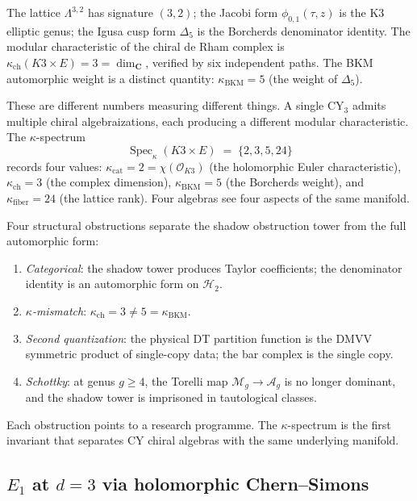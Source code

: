 \documentclass[11pt,reqno]{amsart}
\theoremstyle{definition}
\theoremstyle{remark}
\newcommand{\cM}{\mathcal{M}}
\renewcommand{\Bbbk}{\mathbf{C}}
\numberwithin{equation}{section}
\begin{document}
The lattice $\Lambda^{3,2}$ has signature $(3,2)$; the
Jacobi form $\phi_{0,1}(\tau, z)$ is the K3 elliptic genus;
the Igusa cusp form $\Delta_5$ is the Borcherds denominator
identity. The modular characteristic of the chiral de Rham
complex is $\kappa_{\mathrm{ch}}(K3 \times E) = 3
= \dim_\Bbbk$, verified by six independent paths. The BKM
automorphic weight is a distinct quantity:
$\kappa_{\mathrm{BKM}} = 5$ (the weight of $\Delta_5$).

These are different numbers measuring different things.
A single CY$_3$ admits multiple chiral algebraizations,
each producing a different modular characteristic. The
$\kappa$-spectrum
\begin{equation}\label{eq:kappa-spectrum}
\operatorname{Spec}_\kappa(K3 \times E)
\;=\; \{2, 3, 5, 24\}
\end{equation}
records four values: $\kappa_{\mathrm{cat}} = 2
= \chi(\mathcal{O}_{K3})$ (the holomorphic Euler
characteristic), $\kappa_{\mathrm{ch}} = 3$ (the complex
dimension), $\kappa_{\mathrm{BKM}} = 5$ (the Borcherds
weight), and $\kappa_{\mathrm{fiber}} = 24$ (the lattice
rank). Four algebras see four aspects of the same manifold.

Four structural obstructions separate the shadow obstruction
tower from the full automorphic form:
\begin{enumerate}[label=\textup{(O\arabic*)}]
\item \emph{Categorical}: the shadow tower produces Taylor
 coefficients; the denominator identity is an automorphic form
 on $\mathcal{H}_2$.
\item \emph{$\kappa$-mismatch}:
 $\kappa_{\mathrm{ch}} = 3 \ne 5 = \kappa_{\mathrm{BKM}}$.
\item \emph{Second quantization}: the physical DT partition
 function is the DMVV symmetric product of single-copy data;
 the bar complex is the single copy.
\item \emph{Schottky}: at genus $g \ge 4$, the Torelli map
 $\cM_g \to \mathcal{A}_g$ is no longer dominant, and the
 shadow tower is imprisoned in tautological classes.
\end{enumerate}
Each obstruction points to a research programme. The
$\kappa$-spectrum is the first invariant that separates CY
chiral algebras with the same underlying manifold.


\subsection{$E_1$ at $d = 3$ via holomorphic Chern--Simons}
\label{ssec:e1-holcs}
\end{document}
